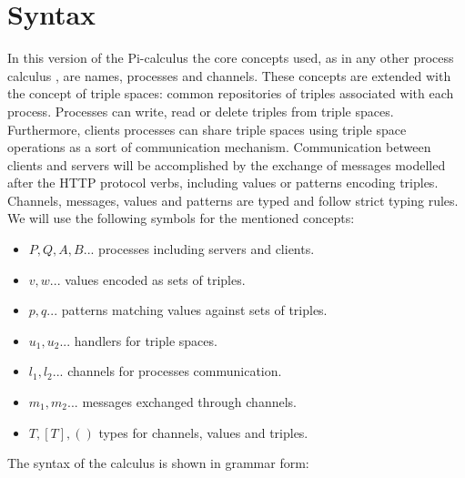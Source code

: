 \section{Syntax}
In this version of the Pi-calculus the core concepts used, as in any other process calculus \cite{Tutorial91thepolyadic} \cite{Milner89acalculus}, are names, processes and channels. These concepts are extended with the concept of triple spaces: common repositories of triples associated with each process. Processes can write, read or delete triples from triple spaces. Furthermore, clients processes can share triple spaces using triple space operations as a sort of communication mechanism. Communication between clients and servers will be accomplished by the exchange of messages modelled after the HTTP protocol verbs, including values or patterns encoding triples. Channels, messages, values and patterns are typed and follow strict typing rules.\\
We will use the following symbols for the mentioned concepts:
\begin{itemize}
\item $P,Q,A,B...$ processes including servers and clients.
\item $v,w...$ values encoded as sets of triples.
\item $p,q...$ patterns matching values against sets of triples.
\item $u_1,u_2...$ handlers for triple spaces.
\item $l_1,l_2... $ channels for processes communication.
\item $m_1,m_2...$ messages exchanged through channels.
\item $T,[T],()$ types for channels, values and triples.
\end{itemize}

The syntax of the calculus is shown in grammar form:


